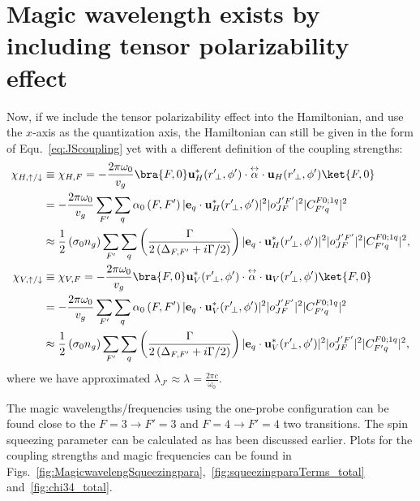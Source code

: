 \section{Magic wavelength exists by including tensor polarizability effect}
Now, if we include the tensor polarizability effect into the Hamiltonian, and use the $ x $-axis as the 
quantization axis, the Hamiltonian can still be given in the form of Equ.~\ref{eq:JScoupling} yet with a 
different definition of the coupling strengths:
\begin{align}
\chi_{H,\uparrow/\downarrow} & \equiv \chi_{H,F} =- \frac{2\pi \omega_0}{v_g} \bra{F,0} 
	\mathbf{u}^*_H(r^\prime\!_\perp, \phi') \cdot \tensor{\alpha} \cdot 
	\mathbf{u}_{H}(r^\prime\!_\perp, 
	\phi') \ket{F,0} \\
	& =- \frac{2\pi \omega_0}{v_g} \sum_{F'} \sum_q \alpha_0\left( F,F'  \right) |\mathbf{e}_q \cdot 
	\mathbf{u}_H^*(r^\prime\!_\perp,\phi')|^2 |o^{J'F'}_{JF} |^2 
	|C^{F 0;1q}_{F' q}|^2\\
	& \approx  \frac{1}{2} \left( \sigma_0 n_g  \right) \sum_{F'} \sum_q\left( 
		\frac{\Gamma}{2 
		\left(\Delta_{F,F'}+i\Gamma/2\right) }  \right) |\mathbf{e}_q \cdot 
		\mathbf{u}_H^*(r^\prime\!_\perp,\phi')|^2 |o^{J'F'}_{JF} |^2 
		|C^{F 0;1q}_{F' q}|^2,\\
\chi_{V,\uparrow/\downarrow} & \equiv \chi_{V,F} =- \frac{2\pi \omega_0}{v_g} \bra{F,0} 
	\mathbf{u}^*_V(r^\prime\!_\perp, \phi') \cdot \tensor{\alpha} \cdot 
	\mathbf{u}_{V}(r^\prime\!_\perp, 
	\phi') \ket{F,0} \\
	& =- \frac{2\pi \omega_0}{v_g} \sum_{F'} \sum_q \alpha_0\left( F,F'  \right) |\mathbf{e}_q \cdot 
	\mathbf{u}_V^*(r^\prime\!_\perp,\phi')|^2 |o^{J'F'}_{JF} |^2 
	|C^{F 0;1q}_{F' q}|^2\\
	& \approx  \frac{1}{2} \left( \sigma_0 n_g  \right) \sum_{F'} \sum_q\left( 
		\frac{\Gamma}{2 
		\left(\Delta_{F,F'}+i\Gamma/2\right) }  \right) |\mathbf{e}_q \cdot 
		\mathbf{u}_V^*(r^\prime\!_\perp,\phi')|^2 |o^{J'F'}_{JF} |^2 
		|C^{F 0;1q}_{F' q}|^2,\\
\end{align}
where we have approximated $ \lambda_{J'}\approx \lambda = \frac{2\pi c}{\omega_0} $.  

The magic wavelengths/frequencies using the one-probe configuration can be found close to the $ 
F=3\rightarrow F'=3 $ and $ F=4\rightarrow F'=4 $ two transitions.
The spin squeezing parameter can be calculated as has been discussed earlier.
Plots for the coupling strengths and magic frequencies can be found in 
Figs.~\ref{fig:MagicwavelengSqueezingpara},~\ref{fig:squeezingparaTerms_total} 
and~\ref{fig:chi34_total}.

